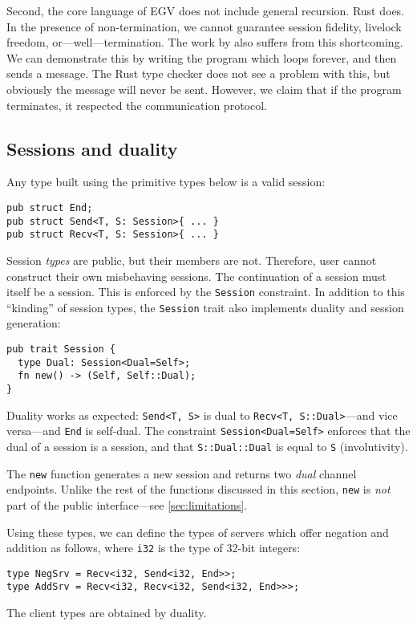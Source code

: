 \documentclass[sigconf,natbib=false]{acmart}
\begin{document}
Second, the core language of EGV does not include general recursion. Rust does. In the presence of non-termination, we cannot guarantee session fidelity, livelock freedom, or---well---termination. The work by \textcite{jespersen2015} also suffers from this shortcoming. We can demonstrate this by writing the program which loops forever, and then sends a message. The Rust type checker does not see a problem with this, but obviously the message will never be sent. However, we claim that if the program terminates, it respected the communication protocol.

\subsection{Sessions and duality}
Any type built using the primitive types below is a valid session:
\begin{lstlisting}
pub struct End;
pub struct Send<T, S: Session>{ ... }
pub struct Recv<T, S: Session>{ ... }
\end{lstlisting}
Session \emph{types} are public, but their members are not. Therefore, user cannot construct their own misbehaving sessions. The continuation of a session must itself be a session. This is enforced by the \lstinline{Session} constraint. In addition to this ``kinding'' of session types, the \lstinline{Session} trait also implements duality and session generation:
\begin{lstlisting}
pub trait Session {
  type Dual: Session<Dual=Self>;
  fn new() -> (Self, Self::Dual);
}
\end{lstlisting}
Duality works as expected: \lstinline{Send<T, S>} is dual to \lstinline{Recv<T, S::Dual>}---and vice versa---and \lstinline{End} is self-dual.
The constraint \lstinline{Session<Dual=Self>} enforces that the dual of a
session is a session, and that \lstinline{S::Dual::Dual} is equal to \lstinline{S} (involutivity).

The \lstinline{new} function generates a new session and returns two \emph{dual} channel endpoints. Unlike the rest of the functions discussed in this section, \lstinline{new} is \emph{not} part of the public interface---see \cref{sec:limitations}.

Using these types, we can define the types of servers which offer negation and addition as follows, where \lstinline{i32} is the type of 32-bit integers:
\begin{lstlisting}
type NegSrv = Recv<i32, Send<i32, End>>;
type AddSrv = Recv<i32, Recv<i32, Send<i32, End>>>;
\end{lstlisting}
The client types are obtained by duality.
\end{document}
